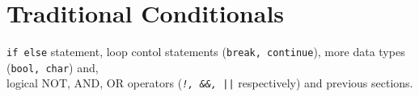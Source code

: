 \section{Traditional Conditionals}
\begin{topics}
\verb!if else! statement, loop contol statements (\verb!break, continue!), more data types (\verb!bool, char!) and, \\logical NOT, AND, OR operators (\emph{\texttt{!, \&\&, ||}} respectively) and previous sections.
\end{topics}



